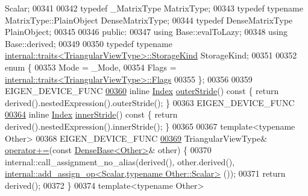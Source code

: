 \begin{DoxyCode}
       Scalar;
00341 
00342     \textcolor{keyword}{typedef} \_MatrixType MatrixType;
00343     \textcolor{keyword}{typedef} \textcolor{keyword}{typename} MatrixType::PlainObject DenseMatrixType;
00344     \textcolor{keyword}{typedef} DenseMatrixType PlainObject;
00345 
00346   \textcolor{keyword}{public}:
00347     \textcolor{keyword}{using} Base::evalToLazy;
00348     \textcolor{keyword}{using} Base::derived;
00349 
00350     \textcolor{keyword}{typedef} \textcolor{keyword}{typename} \hyperlink{struct_eigen_1_1internal_1_1traits}{internal::traits<TriangularViewType>::StorageKind}
       StorageKind;
00351 
00352     \textcolor{keyword}{enum} \{
00353       Mode = \_Mode,
00354       Flags = \hyperlink{struct_eigen_1_1internal_1_1traits}{internal::traits<TriangularViewType>::Flags}
00355     \};
00356 
00359     EIGEN\_DEVICE\_FUNC
\hyperlink{group___core___module_added5657459878085cb95d5052b1dd14}{00360}     \textcolor{keyword}{inline} \hyperlink{group___core___module_a554f30542cc2316add4b1ea0a492ff02}{Index} \hyperlink{group___core___module_added5657459878085cb95d5052b1dd14}{outerStride}()\textcolor{keyword}{ const }\{ \textcolor{keywordflow}{return} derived().nestedExpression().outerStride(); \}
00363     EIGEN\_DEVICE\_FUNC
\hyperlink{group___core___module_aff17b6873e916ed22b8aadc14c2b1df9}{00364}     \textcolor{keyword}{inline} \hyperlink{group___core___module_a554f30542cc2316add4b1ea0a492ff02}{Index} \hyperlink{group___core___module_aff17b6873e916ed22b8aadc14c2b1df9}{innerStride}()\textcolor{keyword}{ const }\{ \textcolor{keywordflow}{return} derived().nestedExpression().innerStride(); \}
00365 
00367     \textcolor{keyword}{template}<\textcolor{keyword}{typename} Other>
00368     EIGEN\_DEVICE\_FUNC
\hyperlink{group___core___module_ab6fa10c605bc81813d6a4ab243bb54b1}{00369}     TriangularViewType&  \hyperlink{group___core___module_ab6fa10c605bc81813d6a4ab243bb54b1}{operator+=}(\textcolor{keyword}{const} \hyperlink{group___core___module_class_eigen_1_1_dense_base}{DenseBase<Other>}& other) \{
00370       internal::call\_assignment\_no\_alias(derived(), other.derived(), 
      \hyperlink{struct_eigen_1_1internal_1_1add__assign__op}{internal::add\_assign\_op<Scalar,typename Other::Scalar>}
      ());
00371       \textcolor{keywordflow}{return} derived();
00372     \}
00374     \textcolor{keyword}{template}<\textcolor{keyword}{typename} Other>

\end{DoxyCode}
